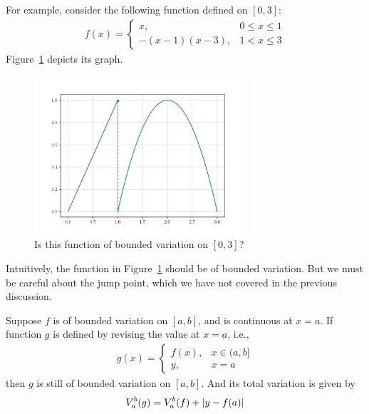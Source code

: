 \documentclass[thmcnt=section, color=blue, 12pt]{my-elegantbook}
\begin{document}
\begin{example} \label{eg:2}
	For example, consider the following function defined on $[0, 3]$:
	\begin{align*}
		f(x) = \begin{cases}
			       x,           & 0 \leq x \leq 1 \\
			       -(x-1)(x-3), & 1 < x \leq 3
		       \end{cases}
	\end{align*}
	Figure~\ref{fig:4} depicts its graph.
	\begin{figure}[H]
		\centering
		\includegraphics[width=0.7\textwidth]{figures/piecewise-function-of-bounded-variation.png}
		\caption{Is this function of bounded variation on $[0, 3]$?}
		\label{fig:4}
	\end{figure}

	Intuitively, the function in Figure~\ref{fig:4} should be of bounded variation.
	But we must be careful about the jump point,
	which we have not covered in the previous discussion.
\end{example}

\begin{proposition} \label{prop:5}
	Suppose $f$ is of bounded variation on $[a, b]$,
	and is continuous at $x = a$.
	If function $g$ is defined by revising the value at $x=a$, i.e.,
	\begin{align*}
		g(x) = \begin{cases}
			       f(x), & x \in (a, b] \\
			       y,    & x = a
		       \end{cases}
	\end{align*}
	then $g$ is still of bounded variation on $[a, b]$.
	And its total variation is given by
	\begin{align*}
		V_a^b(g) = V_a^b(f) + \left\lvert y - f(a) \right\rvert
	\end{align*}
\end{proposition}
\end{document}
